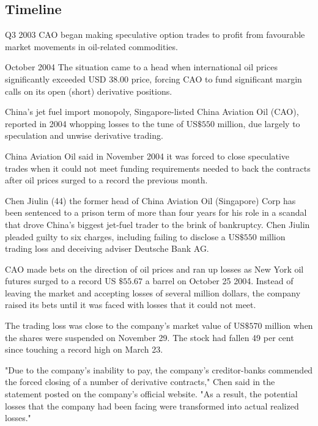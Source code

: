 \documentclass[]{article}
\begin{document}
\subsection*{Timeline}
Q3 2003 CAO began making speculative option trades to profit from favourable market movements in oil-related commodities.
 
October 2004 The situation came to a head when international oil prices significantly exceeded USD 38.00 price, forcing CAO to fund significant margin calls on its open (short) derivative positions. 
 


China's jet fuel import monopoly, Singapore-listed China Aviation Oil (CAO), reported in 2004 whopping losses to the tune of US$\$550$ million, due largely to speculation and unwise derivative trading.
 
China Aviation Oil said in November 2004 it was forced to close speculative trades when it could not meet funding requirements needed to back the contracts after oil prices surged to a record the previous month.

Chen Jiulin (44) the former head of China Aviation Oil (Singapore) Corp has been sentenced to a prison term of more than four years for his role in a scandal that drove China's biggest jet-fuel trader to the brink of bankruptcy.  Chen Jiulin pleaded guilty to six charges, including failing to disclose a US$\$550$ million trading loss and deceiving adviser Deutsche Bank AG.
 
 
CAO made bets on the direction of oil prices and ran up losses as New York oil futures surged to a record US $\$55.67$ a barrel on October 25 2004.
Instead of leaving the market and accepting losses of several million dollars, the company raised its bets until it was faced with losses that it could not meet.

The trading loss was close to the company's market value of US$\$570$ million when the shares were suspended on November 29. The stock had fallen 49 per cent since touching a record high on March 23.

"Due to the company's inability to pay, the company's creditor-banks commended the forced closing of a number of derivative contracts," Chen said in the statement posted on the company's official website. "As a result, the potential losses that the company had been facing were transformed into actual realized losses."

\end{document}
